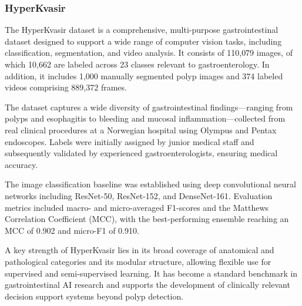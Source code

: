 \subsubsection*{HyperKvasir}

The HyperKvasir dataset is a comprehensive, multi-purpose gastrointestinal dataset designed to support a wide range of computer vision tasks, including classification, segmentation, and video analysis. It consists of 110{,}079 images, of which 10{,}662 are labeled across 23 classes relevant to gastroenterology. In addition, it includes 1{,}000 manually segmented polyp images and 374 labeled videos comprising 889{,}372 frames.

The dataset captures a wide diversity of gastrointestinal findings—ranging from polyps and esophagitis to bleeding and mucosal inflammation—collected from real clinical procedures at a Norwegian hospital using Olympus and Pentax endoscopes. Labels were initially assigned by junior medical staff and subsequently validated by experienced gastroenterologists, ensuring medical accuracy.

The image classification baseline was established using deep convolutional neural networks including ResNet-50, ResNet-152, and DenseNet-161. Evaluation metrics included macro- and micro-averaged F1-scores and the Matthews Correlation Coefficient (MCC), with the best-performing ensemble reaching an MCC of 0.902 and micro-F1 of 0.910.

A key strength of HyperKvasir lies in its broad coverage of anatomical and pathological categories and its modular structure, allowing flexible use for supervised and semi-supervised learning. It has become a standard benchmark in gastrointestinal AI research and supports the development of clinically relevant decision support systems beyond polyp detection.
